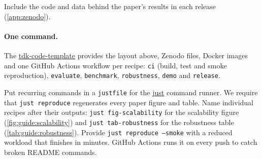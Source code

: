 Include the code and data behind the paper's results in each release (\cref{app:zenodo}).

\paragraph{One command.} The \href{https://github.com/BlackLight54/tdk-code-template}{tdk-code-template} provides the layout above, Zenodo files, Docker images and one GitHub Actions workflow per recipe: \texttt{ci} (build, test and smoke reproduction), \texttt{evaluate}, \texttt{benchmark}, \texttt{robustness}, \texttt{demo} and \texttt{release}.

Put recurring commands in a \texttt{justfile} for the \href{https://github.com/casey/just}{just} command runner. We require that \texttt{just reproduce} regenerates every paper figure and table. Name individual recipes after their outputs: \texttt{just fig-scalability} for the scalability figure (\cref{fig:guide:scalability}) and \texttt{just tab-robustness} for the robustness table (\cref{tab:guide:robustness}). Provide \texttt{just reproduce --smoke} with a reduced workload that finishes in minutes. GitHub Actions runs it on every push to catch broken README commands.

